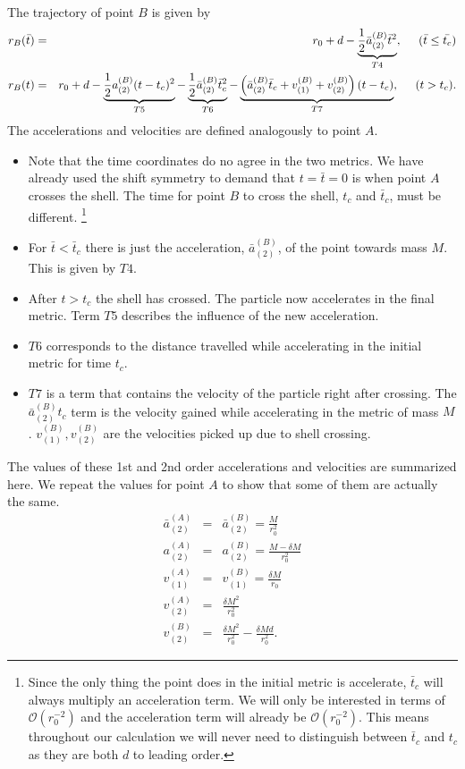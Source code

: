 \documentclass[aps,showpacs,onecolumn,floats,prd,superscriptaddress,nofootinbib]{revtex4-1}
\begin{document}
The trajectory of point $B$ is given by
\begin{eqnarray}
	r_B(\bar{t}) & = &  r_0 + d  - \underbrace{\frac{1}{2} \bar{a}_{(2)}^{(B)} \bar{t}^2}_{T4},  \hspace{5mm} (\bar{t} \leq \bar{t_c})	\nonumber	\\
	r_B(t) & = & r_0 +d  - \underbrace{\frac{1}{2} a_{(2)}^{(B)}(t-t_c)^2}_{T5} -  \underbrace{\frac{1}{2}  \bar{a}^{(B)}_{(2)} \bar{t}_c^2}_{T6} - \underbrace{\left( \bar{a}_{(2)}^{(B)} \bar{t}_c + v^{(B)}_{(1)} + v^{(B)}_{(2)} \right)(t-t_c)}_{T7} ,  \hspace{5mm}  (t>t_c).	\label{rB}
\end{eqnarray}
The accelerations and velocities are defined analogously to point $A$. 
\begin{itemize}
\item Note that the time coordinates do no agree in the two metrics. 
We have already used the shift symmetry to demand that $t=\bar{t}=0$ is when point $A$ crosses the shell.
The time for point $B$ to cross the shell, $t_c$ and $\bar{t}_c$, must be different.
\footnote{Since the only thing the point does in the initial metric is accelerate, $\bar{t}_c$ will always multiply an acceleration term. 
We will only be interested in terms of $\mathcal{O}(r_0^{-2})$ and the acceleration term will already be $\mathcal{O}(r_0^{-2})$. 
This means throughout our calculation we will never need to distinguish between $\bar{t}_c$ and $t_c$ as they are both $d$ to leading order.}
\item For $\bar{t} <\bar{t}_c$ there is just the acceleration, $\bar{a}^{(B)}_{(2)}$, of the point towards mass $M$. This is given by $T4$.  
\item After $t>t_c$ the shell has crossed. The particle now accelerates in the final metric.
Term $T5$ describes the influence of the new acceleration. 
\item $T6$ corresponds to the distance travelled while accelerating in the initial metric for time $t_c$. 
\item $T7$ is a term that contains the velocity of the particle right after crossing. The $\bar{a}^{(B)}_{(2)} t_c$ term is the velocity gained while accelerating in the metric of mass $M$. $v_{(1)}^{(B)}, v_{(2)}^{(B)}$ are the velocities picked up due to shell crossing.
\end{itemize}
The values of these 1st and 2nd order accelerations and velocities are summarized here.
We repeat the values for point $A$ to show that some of them are actually the same.
\begin{eqnarray}
	\bar{a}^{(A)}_{(2)} & = & \bar{a}^{(B)}_{(2)} =  \frac{M}{r_0^2}	\nonumber	\\
	a^{(A)}_{(2)} & = & a^{(B)}_{(2)}=  \frac{M - \delta M}{r_0^2}	\nonumber	\\
	v^{(A)}_{(1)} & = & v^{(B)}_{(1)} =  \frac{\delta M}{r_0} 	\nonumber	\\
	v^{(A)}_{(2)} & = &  \frac{\delta M^2}{r_0^2}		\nonumber	\\
	v^{(B)}_{(2)} & = & \frac{\delta M^2}{r_0^2} - \frac{\delta M d}{r_0^2}.		
\end{eqnarray}
\end{document}
